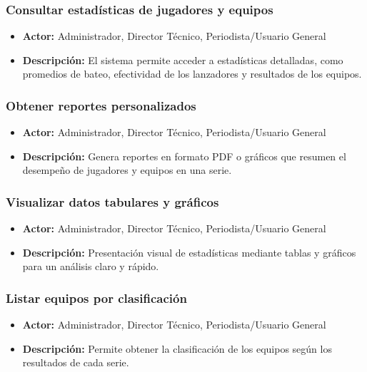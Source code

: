 \documentclass{report}
\begin{document}
\begin{enumerate}
            \subsubsection{Consultar estadísticas de jugadores y equipos}
            \begin{itemize}
                \item \textbf{Actor:} Administrador, Director Técnico, Periodista/Usuario General
                \item \textbf{Descripción:} El sistema permite acceder a estadísticas detalladas, como promedios de 
                bateo, efectividad de los lanzadores y resultados de los equipos.
            \end{itemize}

            \subsubsection{Obtener reportes personalizados}
            \begin{itemize}
                \item \textbf{Actor:} Administrador, Director Técnico, Periodista/Usuario General
                \item \textbf{Descripción:} Genera reportes en formato PDF o gráficos que resumen el desempeño de 
                jugadores y equipos en una serie.
            \end{itemize}

            \subsubsection{Visualizar datos tabulares y gráficos}
            \begin{itemize}
                \item \textbf{Actor:} Administrador, Director Técnico, Periodista/Usuario General
                \item \textbf{Descripción:} Presentación visual de estadísticas mediante tablas y gráficos para un 
                análisis claro y rápido.
            \end{itemize}

            \subsubsection{Listar equipos por clasificación}
            \begin{itemize}
                \item \textbf{Actor:} Administrador, Director Técnico, Periodista/Usuario General
                \item \textbf{Descripción:} Permite obtener la clasificación de los equipos según los resultados de 
                cada serie.
            \end{itemize}


\end{enumerate}
\end{document}
